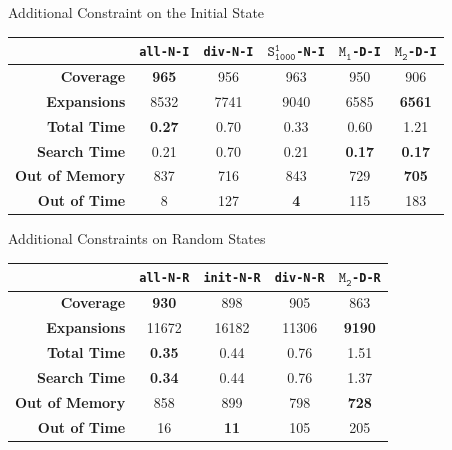 \documentclass[aspectratio=169, xcolor=dvipsnames]{beamer}
\begin{document}
    \begin{frame}[c]{Additional Constraint on the Initial State}
        \begin{table}[h!]
            \center
            \begin{tabular}{|r|c|c|c|c|c|}
                \hline
                & \textbf{\texttt{all-N-I}} & \textbf{\texttt{div-N-I}} & \textbf{$\texttt{S}_{\texttt{1000}}^{\texttt{1}}$\texttt{-N-I}} & \textbf{$\texttt{M}_{\texttt{1}}$\texttt{-D-I}} & \textbf{$\texttt{M}_{\texttt{2}}$\texttt{-D-I}} \\
                \hline \hline
                \textbf{Coverage}       & \textbf{965}  & 956 & 963 & 950 & 906 \\ \hline
                \textbf{Expansions}     & 8532 & 7741 & 9040 & 6585 & \textbf{6561} \\ \hline
                \textbf{Total Time}     & \textbf{0.27} & 0.70 & 0.33 & 0.60 & 1.21 \\ \hline
                \textbf{Search Time}    & 0.21 & 0.70 & 0.21 & \textbf{0.17} & \textbf{0.17} \\ \hline
                \textbf{Out of Memory}  & 837 & 716 & 843 & 729 & \textbf{705} \\ \hline
                \textbf{Out of Time}    & 8 & 127 & \textbf{4}& 115 & 183 \\ \hline
            \end{tabular}
        \end{table}
    \end{frame}

    \begin{frame}[c]{Additional Constraints on Random States}
        \begin{table}[h!]
            \center
            \begin{tabular}{|r|c|c|c|c|}
                \hline
                & \textbf{\texttt{all-N-R}} & \textbf{\texttt{init-N-R}} &\textbf{\texttt{div-N-R}} & \textbf{$\texttt{M}_{\texttt{2}}$\texttt{-D-R}} \\
                \hline \hline
                \textbf{Coverage}       & \textbf{930}  & 898 & 905 & 863 \\ \hline
                \textbf{Expansions}     & 11672 & 16182 & 11306 & \textbf{9190} \\ \hline
                \textbf{Total Time}     & \textbf{0.35} & 0.44 & 0.76 & 1.51 \\ \hline
                \textbf{Search Time}    & \textbf{0.34} & 0.44 & 0.76 & 1.37 \\ \hline
                \textbf{Out of Memory}  & 858 & 899 & 798 & \textbf{728} \\ \hline
                \textbf{Out of Time}    & 16 & \textbf{11}   & 105 & 205 \\ \hline
            \end{tabular}
        \end{table}
    \end{frame}
\end{document}
